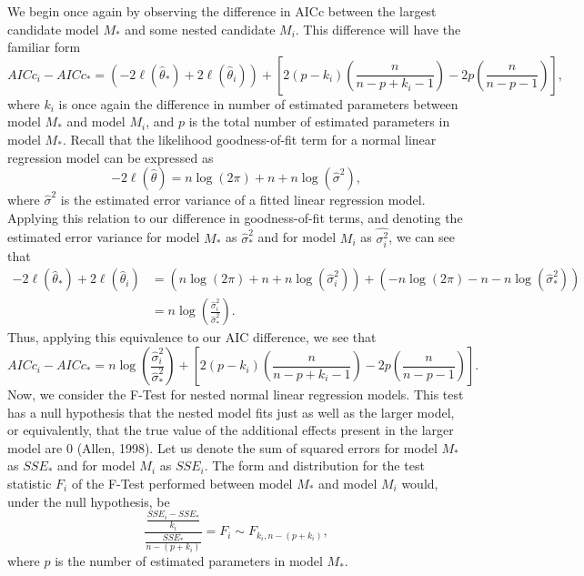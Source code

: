 We begin once again by observing the difference in AICc between the largest candidate model $M_*$ and some nested candidate $M_i$. This difference
will have the familiar form
\begin{equation}
	AICc_i - AICc_* = \left( -2 \ell (\hat{\theta}_*) + 2 \ell (\hat{\theta}_i) \right) + \left[ 2(p-k_i) \left( \frac{n}{n-p+k_i-1} \right) - 2p \left( \frac{n}{n-p-1} \right) \right] ,
\end{equation}
where $k_i$ is once again the difference in number of estimated parameters between model $M_*$ and model $M_i$, and $p$ is the total number of
estimated parameters in model $M_*$. Recall that the likelihood goodness-of-fit term for a normal linear regression model can be expressed as
\begin{equation}
	-2 \ell (\hat{\theta}) = n \log(2 \pi) + n + n \log(\hat{\sigma} ^2 ) ,
\end{equation}
where $\hat{\sigma} ^2$ is the estimated error variance of a fitted linear regression model. Applying this relation to our difference in goodness-of-fit
terms, and denoting the estimated error variance for model $M_*$ as $\hat{\sigma}_* ^2$ and for model $M_i$ as $\hat{\sigma^2_i}$, we can see that
\begin{equation}
	\begin{split}
	-2 \ell (\hat{\theta}_*) + 2 \ell (\hat{\theta}_i) & = (n\log(2\pi) + n + n\log(\hat{\sigma}^2_i)) + (-n\log(2\pi) - n - n\log(\hat{\sigma}^2_*)) \\
	& = n\log \left( \frac{\hat{\sigma}^2_i}{\hat{\sigma}^2_*} \right) .
	\end{split}
\end{equation}
Thus, applying this equivalence to our AIC difference, we see that
\begin{equation}
	AICc_i - AICc_* = n\log \left( \frac{\hat{\sigma}^2_i}{\hat{\sigma}^2_*} \right) + \left[ 2(p-k_i) \left( \frac{n}{n-p+k_i-1} \right) - 2p \left( \frac{n}{n-p-1} \right) \right] .
\end{equation}
Now, we consider the F-Test for nested normal linear regression models. This test has a null hypothesis that the nested model fits just as well as the
larger model, or equivalently, that the true value of the additional effects present in the larger model are 0 (Allen, 1998). Let us denote the sum
of squared errors for model $M_*$ as $SSE_*$ and for model $M_i$ as $SSE_i$. The form and distribution for the test statistic $F_i$ of the F-Test 
performed between model $M_*$ and model $M_i$ would, under the null hypothesis, be
\begin{equation}
	\frac{\frac{SSE_i - SSE_*}{k_i}}{\frac{SSE_*}{n-(p+k_i)}} = F_i \sim F_{k_i, n-(p+k_i)} ,
\end{equation}
where $p$ is the number of estimated parameters in model $M_*$.

